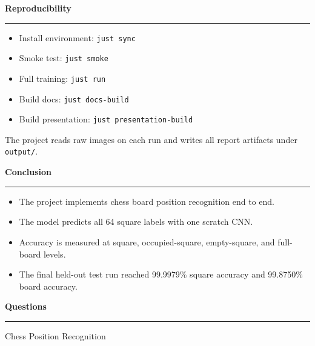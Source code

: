 \documentclass[aspectratio=169,10pt]{beamer}
\newcommand{\SlideTitle}[1]{%
  \vspace{0.2em}%
  {\titlefont\color{TitleBlack}\Large\bfseries #1}\par\vspace{0.35em}%
  {\color{Accent}\rule{0.16\paperwidth}{1.4pt}}\vspace{0.7em}%
}
\begin{document}
\begin{frame}
  \SlideTitle{Reproducibility}
  \begin{itemize}
    \item Install environment: \texttt{just sync}
    \item Smoke test: \texttt{just smoke}
    \item Full training: \texttt{just run}
    \item Build docs: \texttt{just docs-build}
    \item Build presentation: \texttt{just presentation-build}
  \end{itemize}
  \vspace{1em}
  {\color{BodyGrey}\small The project reads raw images on each run and writes all report artifacts under \texttt{output/}.}
\end{frame}

\begin{frame}
  \SlideTitle{Conclusion}
  \begin{itemize}
    \item The project implements chess board position recognition end to end.
    \item The model predicts all 64 square labels with one scratch CNN.
    \item Accuracy is measured at square, occupied-square, empty-square, and full-board levels.
    \item The final held-out test run reached 99.9979\% square accuracy and 99.8750\% board accuracy.
  \end{itemize}
\end{frame}

\begin{frame}[plain]
  \vfill
  {\titlefont\color{TitleBlack}\Huge\bfseries Questions}\par
  \vspace{0.7em}
  {\color{Accent}\rule{0.25\paperwidth}{2pt}}\par
  \vspace{1em}
  {\color{BodyGrey}\Large Chess Position Recognition}\par
  \vfill
\end{frame}
\end{document}
